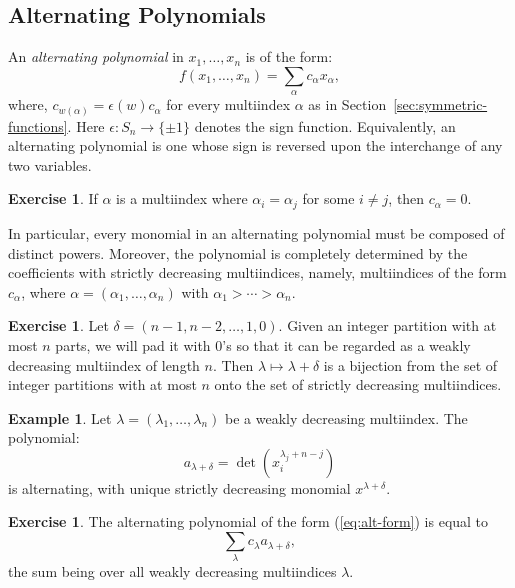 \documentclass[11pt]{amsart}
\theoremstyle{definition}
\theoremstyle{example}
\newtheorem{example}[theorem]{Example}
\newtheorem{exercise}[theorem]{Exercise}
\begin{document}
\subsection{Alternating Polynomials}
\label{sec:alt-poly}
An \emph{alternating polynomial} in $x_1,\dotsc, x_n$ is of the form:
\begin{equation}
  \label{eq:alt-form}
  f(x_1,\dotsc,x_n) = \sum_{\alpha} c_\alpha x_\alpha,
\end{equation}
where, $c_{w(\alpha)} = \epsilon(w)c_\alpha$ for every multiindex $\alpha$ as in Section~\ref{sec:symmetric-functions}.
Here $\epsilon:S_n\to \{\pm 1\}$ denotes the sign function.
Equivalently, an alternating polynomial is one whose sign is reversed upon the interchange of any two variables.
\begin{exercise}
  If $\alpha$ is a multiindex where $\alpha_i=\alpha_j$ for some $i\neq j$, then $c_\alpha = 0$.
\end{exercise}
In particular, every monomial in an alternating polynomial must be composed of distinct powers.
Moreover, the polynomial is completely determined by the coefficients with strictly decreasing multiindices, namely, multiindices of the form $c_\alpha$, where $\alpha=(\alpha_1,\dotsc,\alpha_n)$ with $\alpha_1>\dotsb>\alpha_n$.
\begin{exercise}
  Let $\delta=(n-1,n-2,\dotsc,1, 0)$.
  Given an integer partition with at most $n$ parts, we will pad it with $0$'s so that it can be regarded as a weakly decreasing multiindex of length $n$.
  Then $\lambda\mapsto \lambda+\delta$ is a bijection from the set of integer partitions with at most $n$ onto the set of strictly decreasing multiindices.
\end{exercise}
\begin{example}
  Let $\lambda = (\lambda_1,\dotsc, \lambda_n)$ be a weakly decreasing multiindex.
  The polynomial:
  \begin{displaymath}
    a_{\lambda+\delta} = \det(x_i^{\lambda_j + n - j})
  \end{displaymath}
  is alternating, with unique strictly decreasing monomial $x^{\lambda+\delta}$.
\end{example}
\begin{exercise}
  \label{exercise:alt-basis}
  The alternating polynomial of the form \textup{(\ref{eq:alt-form})} is equal to  \begin{displaymath}
    \sum_{\lambda} c_\lambda a_{\lambda+\delta},
  \end{displaymath}
  the sum being over all weakly decreasing multiindices $\lambda$.
\end{exercise}
\end{document}
